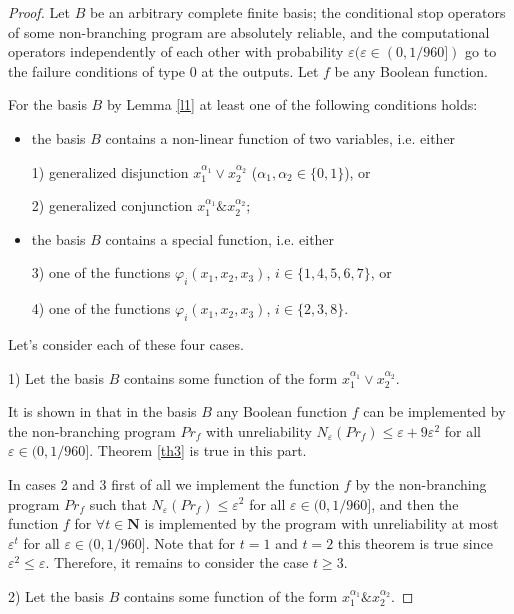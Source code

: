 \documentclass[
11pt,%
tightenlines,%
twoside,%
onecolumn,%
nofloats,%
nobibnotes,%
nofootinbib,%
superscriptaddress,%
noshowpacs,%
centertags]%
{revtex4}
\begin{document}
\begin{proof}
Let $B$ be an arbitrary complete finite basis;
 the conditional stop operators of some non-branching program are absolutely
 reliable, and the computational operators independently of each other with
 probability $\varepsilon (\varepsilon\in (0,1/960])$ go to the failure conditions
 of type 0 at the outputs. Let $f$ be any Boolean function.

For the basis $B$ by Lemma \ref{l1} at least one of the following conditions holds:

\begin{itemize}
  \item the basis $B$ contains a non-linear function of two variables, i.e. either

    1) generalized disjunction $x_1^{\alpha_1}\vee x_2^{\alpha_2}$ ($\alpha_1, \alpha_2 \in \{0, 1\}$), or

    2) generalized conjunction $x_1^{\alpha_1}\& x_2^{\alpha_2}$;
 \item the basis $B$ contains a special function, i.e. either

    3) one of the functions $\varphi_i(x_1, x_2, x_3)$, $i \in \{1, 4, 5, 6, 7\}$, or

    4) one of the functions $\varphi_i(x_1, x_2, x_3)$, $i \in \{2, 3, 8\}$.
\end{itemize}

Let's consider each of these four cases.

1) Let the basis $B$ contains some function of the form $x_1^{\alpha_1}\vee x_2^{\alpha_2}$.

It is shown in \cite{17} that in the basis $B$ any  Boolean function
$f$ can be implemented by the non-branching program $Pr_f$ with
unreliability $N_\varepsilon (Pr_f) \leq\varepsilon +
9\varepsilon^2$ for all $\varepsilon\in (0,1 / 960]$. Theorem
\ref{th3} is true in this part.

In cases 2 and 3 first of all we implement the function  $f$ by the
non-branching program $Pr_f$ such that $N_\varepsilon (Pr_f)
\leq\varepsilon^2$ for all $\varepsilon\in (0,1 / 960]$, and then
the function $f$ for $\forall t\in \mathbf{N}$ is implemented by the
program with unreliability at most $\varepsilon^t$ for all
$\varepsilon\in (0,1 / 960]$. Note that for $t = 1$ and $t = 2$ this
theorem is true since $\varepsilon^2\leq\varepsilon$. Therefore, it
remains to consider the case $t\geq3$.

2) Let the basis $B$ contains some function of the  form
$x_1^{\alpha_1}\& x_2^{\alpha_2}$.


\end{proof}
\end{document}
